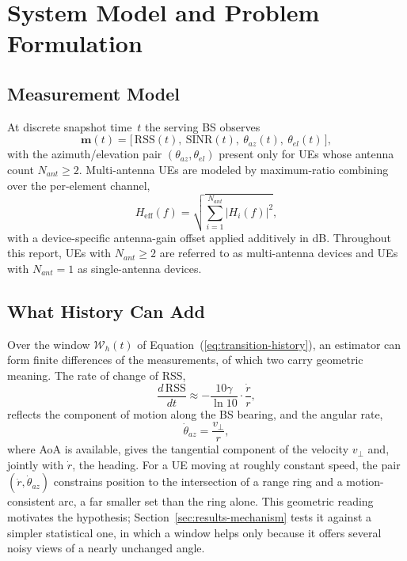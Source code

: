 \section{System Model and Problem Formulation}
\label{sec:system-model}

\subsection{Measurement Model}
\label{subsec:measurement-model}

At discrete snapshot time~$t$ the serving BS observes
\begin{equation}
  \mathbf{m}(t) = \big[\, \mathrm{RSS}(t),\ \mathrm{SINR}(t),\ \theta_{az}(t),\ \theta_{el}(t) \,\big],
  \label{eq:measurement-vector}
\end{equation}
with the azimuth/elevation pair $(\theta_{az}, \theta_{el})$ present only for UEs whose antenna count $N_{ant} \ge 2$. Multi-antenna UEs are modeled by maximum-ratio combining over the per-element channel,
\begin{equation}
  H_{\text{eff}}(f) = \sqrt{\textstyle\sum_{i=1}^{N_{ant}} \lvert H_i(f) \rvert^2},
  \label{eq:mrc}
\end{equation}
with a device-specific antenna-gain offset applied additively in dB. Throughout this report, UEs with $N_{ant} \ge 2$ are referred to as multi-antenna devices and UEs with $N_{ant} = 1$ as single-antenna devices.

\subsection{What History Can Add}
\label{subsec:history-dof}

Over the window $\mathcal{W}_h(t)$ of Equation~(\ref{eq:transition-history}), an estimator can form finite differences of the measurements, of which two carry geometric meaning. The rate of change of RSS,
\begin{equation}
  \frac{d\,\mathrm{RSS}}{dt} \approx -\frac{10\gamma}{\ln 10} \cdot \frac{\dot r}{r},
  \label{eq:drss-dt}
\end{equation}
reflects the component of motion along the BS bearing, and the angular rate,
\begin{equation}
  \dot\theta_{az} = \frac{v_\perp}{r},
  \label{eq:dtheta-dt}
\end{equation}
where AoA is available, gives the tangential component of the velocity $v_\perp$ and, jointly with $\dot r$, the heading. For a UE moving at roughly constant speed, the pair $(\dot r, \dot\theta_{az})$ constrains position to the intersection of a range ring and a motion-consistent arc, a far smaller set than the ring alone. This geometric reading motivates the hypothesis; Section~\ref{sec:results-mechanism} tests it against a simpler statistical one, in which a window helps only because it offers several noisy views of a nearly unchanged angle.

